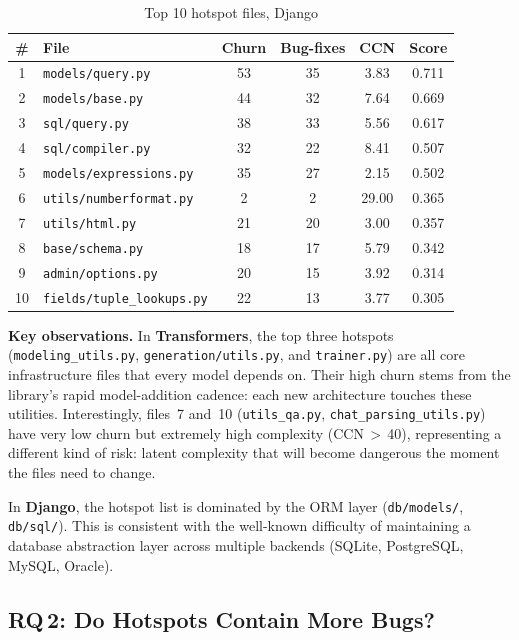 \documentclass[12pt,a4paper]{article}
\begin{document}
\begin{table}[!htb]
\centering
\footnotesize
\caption{Top 10 hotspot files, Django}
\label{tab:top_django}
\begin{tabular}{clcccc}
\toprule
\# & File & Churn & Bug-fixes & CCN & Score \\
\midrule
1 & \texttt{models/query.py}         & 53 & 35 & 3.83  & 0.711 \\
2 & \texttt{models/base.py}          & 44 & 32 & 7.64  & 0.669 \\
3 & \texttt{sql/query.py}            & 38 & 33 & 5.56  & 0.617 \\
4 & \texttt{sql/compiler.py}         & 32 & 22 & 8.41  & 0.507 \\
5 & \texttt{models/expressions.py}   & 35 & 27 & 2.15  & 0.502 \\
6 & \texttt{utils/numberformat.py}   & 2  & 2  & 29.00 & 0.365 \\
7 & \texttt{utils/html.py}           & 21 & 20 & 3.00  & 0.357 \\
8 & \texttt{base/schema.py}          & 18 & 17 & 5.79  & 0.342 \\
9 & \texttt{admin/options.py}        & 20 & 15 & 3.92  & 0.314 \\
10& \texttt{fields/tuple\_lookups.py} & 22 & 13 & 3.77  & 0.305 \\
\bottomrule
\end{tabular}
\end{table}

\textbf{Key observations.}
In \textbf{Transformers}, the top three hotspots (\texttt{modeling\_utils.py}, \texttt{generation/utils.py}, and \texttt{trainer.py}) are all core infrastructure files that every model depends on.
Their high churn stems from the library's rapid model-addition cadence: each new architecture touches these utilities.
Interestingly, files~7 and~10 (\texttt{utils\_qa.py}, \texttt{chat\_parsing\_utils.py}) have very low churn but extremely high complexity (CCN\,$>$\,40), representing a different kind of risk: latent complexity that will become dangerous the moment the files need to change.

In \textbf{Django}, the hotspot list is dominated by the ORM layer (\texttt{db/models/}, \texttt{db/sql/}).
This is consistent with the well-known difficulty of maintaining a database abstraction layer across multiple backends (SQLite, PostgreSQL, MySQL, Oracle).

\FloatBarrier
\subsection{\texorpdfstring{RQ\,2}{RQ 2}: Do Hotspots Contain More Bugs?}
\end{document}
